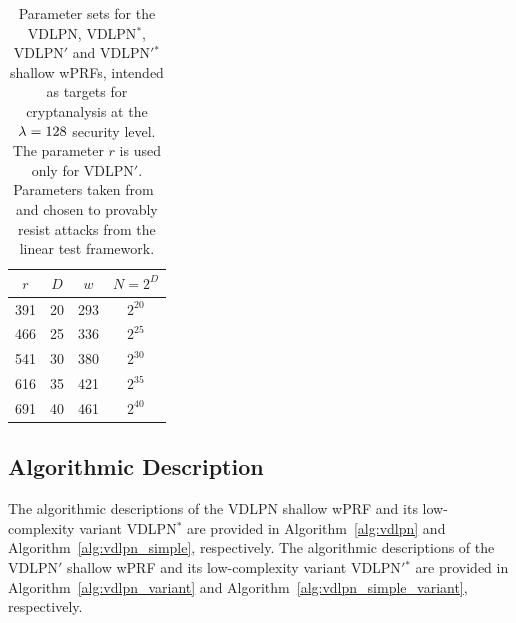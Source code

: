 \begin{table}[!ht]
\centering
\begin{tabular}{cccc} 
\toprule
$r$ & $D$ &  $w$ & $N = 2^D$\\
\midrule
391 & 20 & 293 & $2^{20}$\\
466 & 25 & 336 & $2^{25}$\\
541 & 30 & 380 & $2^{30}$\\
616 & 35 & 421 & $2^{35}$\\
691 & 40 & 461 & $2^{40}$\\
\bottomrule
\end{tabular}
\caption{\label{tab:vdlpn-param}Parameter sets for the {\sf VDLPN}, {\sf VDLPN}$^*$, {\sf VDLPN}$'$ and {{\sf VDLPN}$'$}$^*$ shallow wPRFs, intended as targets for cryptanalysis at the $\lambda = 128$ security level. The parameter $r$ is used only for {\sf VDLPN}$'$. Parameters taken from~\cite{PKC:CouDuc23} and chosen to provably resist attacks from the linear test framework.}
\end{table}

\subsection{Algorithmic Description}

The algorithmic descriptions of the {\sf VDLPN} shallow wPRF and its low-complexity variant {\sf VDLPN}$^*$ are provided in Algorithm~\ref{alg:vdlpn} and Algorithm~\ref{alg:vdlpn_simple}, respectively. The algorithmic descriptions of the {\sf VDLPN}$'$ shallow wPRF and its low-complexity variant {{\sf VDLPN}$'$}$^*$ are provided in Algorithm~\ref{alg:vdlpn_variant} and Algorithm~\ref{alg:vdlpn_simple_variant}, respectively.


